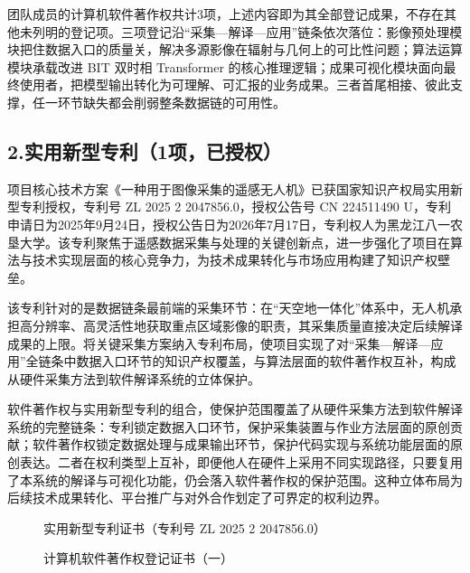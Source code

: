 \documentclass[12pt, a4paper]{ctexart}
\begin{document}
团队成员的计算机软件著作权共计3项，上述内容即为其全部登记成果，不存在其他未列明的登记项。三项登记沿“采集—解译—应用”链条依次落位：影像预处理模块把住数据入口的质量关，解决多源影像在辐射与几何上的可比性问题；算法运算模块承载改进 BIT 双时相 Transformer 的核心推理逻辑；成果可视化模块面向最终使用者，把模型输出转化为可理解、可汇报的业务成果。三者首尾相接、彼此支撑，任一环节缺失都会削弱整条数据链的可用性。

\subsection{2.实用新型专利（1项，已授权）}

项目核心技术方案《一种用于图像采集的遥感无人机》已获国家知识产权局实用新型专利授权，专利号 ZL 2025 2 2047856.0，授权公告号 CN 224511490 U，专利申请日为2025年9月24日，授权公告日为2026年7月17日，专利权人为黑龙江八一农垦大学。该专利聚焦于遥感数据采集与处理的关键创新点，进一步强化了项目在算法与技术实现层面的核心竞争力，为技术成果转化与市场应用构建了知识产权壁垒。

该专利针对的是数据链条最前端的采集环节：在“天空地一体化”体系中，无人机承担高分辨率、高灵活性地获取重点区域影像的职责，其采集质量直接决定后续解译成果的上限。将关键采集方案纳入专利布局，使项目实现了对“采集—解译—应用”全链条中数据入口环节的知识产权覆盖，与算法层面的软件著作权互补，构成从硬件采集方法到软件解译系统的立体保护。

软件著作权与实用新型专利的组合，使保护范围覆盖了从硬件采集方法到软件解译系统的完整链条：专利锁定数据入口环节，保护采集装置与作业方法层面的原创贡献；软件著作权锁定数据处理与成果输出环节，保护代码实现与系统功能层面的原创表达。二者在权利类型上互补，即便他人在硬件上采用不同实现路径，只要复用了本系统的解译与可视化功能，仍会落入软件著作权的保护范围。这种立体布局为后续技术成果转化、平台推广与对外合作划定了可界定的权利边界。

\begin{figure}[htbp]
    \centering
    \caption{实用新型专利证书（专利号 ZL 2025 2 2047856.0）}
    \label{fig:10}
\end{figure}

\begin{figure}[htbp]
    \centering
    \caption{计算机软件著作权登记证书（一）}
    \label{fig:11}
\end{figure}
\end{document}
